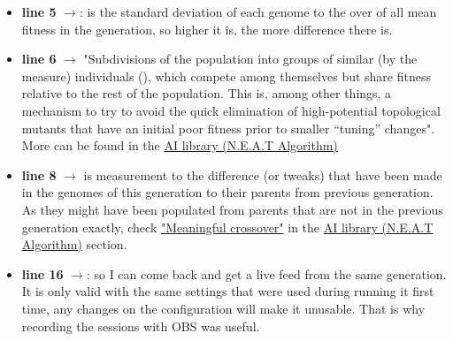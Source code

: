 \begin{itemize}
\item \textbf{line 5} $\rightarrow$: is the standard deviation of each genome to the over of all mean fitness in the generation, so higher it is, the more difference there is.


\item \textbf{line 6} $\rightarrow$ "Subdivisions of the population into groups of similar (by the \cite{NEAT_Overview_-_Genomic_distance} measure) individuals (), which compete among themselves but share fitness relative to the rest of the population. This is, among other things, a mechanism to try to avoid the quick elimination of high-potential topological mutants that have an initial poor fitness prior to smaller “tuning” changes". More can be found in the \hyperref[sec:ai-library-neat-algorithm]{AI library (N.E.A.T Algorithm)}


\item \textbf{line 8} $\rightarrow$ is measurement to the difference (or tweaks) that have been made in the genomes of this generation to their parents from previous generation. As they might have been populated from parents that are not in the previous generation exactly, check \hyperref[list:3tweanns]{"Meaningful crossover"} in the \hyperref[sec:ai-library-neat-algorithm]{AI library (N.E.A.T Algorithm)} section.

\item \textbf{line 16} $\rightarrow$: so I can come back and get a live feed from the same generation. It is only valid with the same settings that were used during running it first time, any changes on the configuration will make it unusable. That is why recording the sessions with OBS was useful.
\end{itemize}
 
 
 
 
 
 
 
 
 
 
